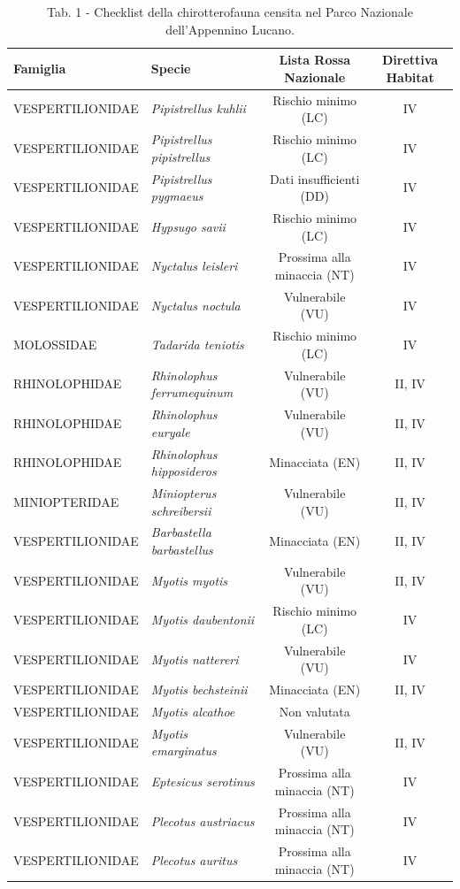 \begin{multicols}{2}
\begin{table}[t]
\caption*{Tab. 1 - Checklist della chirotterofauna censita nel Parco Nazionale dell’Appennino Lucano.}
\centering\small
\begin{tabular}{llcc}
\textbf{Famiglia}&\textbf{Specie}&\textbf{Lista Rossa Nazionale}&\textbf{Direttiva Habitat}\\
\hline
VESPERTILIONIDAE & \emph{Pipistrellus  kuhlii} & Rischio minimo (LC) & IV \\
VESPERTILIONIDAE & \emph{Pipistrellus pipistrellus} & Rischio minimo (LC) & IV \\
VESPERTILIONIDAE & \emph{Pipistrellus pygmaeus} & Dati insufficienti (DD) & IV \\
VESPERTILIONIDAE & \emph{Hypsugo savii} & Rischio minimo (LC) & IV \\
VESPERTILIONIDAE & \emph{Nyctalus leisleri} & Prossima alla minaccia (NT) & IV \\
VESPERTILIONIDAE & \emph{Nyctalus noctula} & Vulnerabile (VU) & IV \\
MOLOSSIDAE & \emph{Tadarida teniotis} & Rischio minimo (LC) & IV \\
RHINOLOPHIDAE & \emph{Rhinolophus ferrumequinum} & Vulnerabile (VU) & II, IV \\
RHINOLOPHIDAE & \emph{Rhinolophus euryale} & Vulnerabile (VU) & II, IV \\
RHINOLOPHIDAE & \emph{Rhinolophus hipposideros} & Minacciata (EN) & II, IV \\
MINIOPTERIDAE & \emph{Miniopterus schreibersii} & Vulnerabile (VU) & II, IV \\
VESPERTILIONIDAE & \emph{Barbastella barbastellus} & Minacciata (EN) & II, IV \\
VESPERTILIONIDAE & \emph{Myotis myotis} & Vulnerabile (VU) & II, IV \\
VESPERTILIONIDAE & \emph{Myotis daubentonii} & Rischio minimo (LC) & IV \\
VESPERTILIONIDAE & \emph{Myotis nattereri} & Vulnerabile (VU) & IV \\
VESPERTILIONIDAE & \emph{Myotis bechsteinii} & Minacciata (EN) & II, IV \\
VESPERTILIONIDAE & \emph{Myotis alcathoe} & Non valutata &   \\
VESPERTILIONIDAE & \emph{Myotis emarginatus} & Vulnerabile (VU) & II, IV \\
VESPERTILIONIDAE & \emph{Eptesicus serotinus} & Prossima alla minaccia (NT) & IV \\
VESPERTILIONIDAE & \emph{Plecotus austriacus} & Prossima alla minaccia (NT) & IV \\
VESPERTILIONIDAE & \emph{Plecotus auritus} & Prossima alla minaccia (NT) & IV \\
\end{tabular}
\end{table}


\end{multicols}

